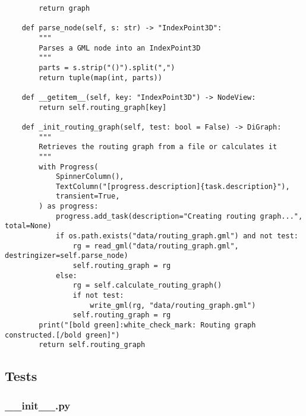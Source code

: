 \begin{verbatim}
        return graph

    def parse_node(self, s: str) -> "IndexPoint3D":
        """
        Parses a GML node into an IndexPoint3D
        """
        parts = s.strip("()").split(",")
        return tuple(map(int, parts))

    def __getitem__(self, key: "IndexPoint3D") -> NodeView:
        return self.routing_graph[key]

    def _init_routing_graph(self, test: bool = False) -> DiGraph:
        """
        Retrieves the routing graph from a file or calculates it
        """
        with Progress(
            SpinnerColumn(),
            TextColumn("[progress.description]{task.description}"),
            transient=True,
        ) as progress:
            progress.add_task(description="Creating routing graph...", total=None)
            if os.path.exists("data/routing_graph.gml") and not test:
                rg = read_gml("data/routing_graph.gml", destringizer=self.parse_node)
                self.routing_graph = rg
            else:
                rg = self.calculate_routing_graph()
                if not test:
                    write_gml(rg, "data/routing_graph.gml")
                self.routing_graph = rg
        print("[bold green]:white_check_mark: Routing graph constructed.[/bold green]")
        return self.routing_graph

\end{verbatim}
\subsection{Tests}
\subsubsection{__init__.py}
\begin{verbatim}

\end{verbatim}
